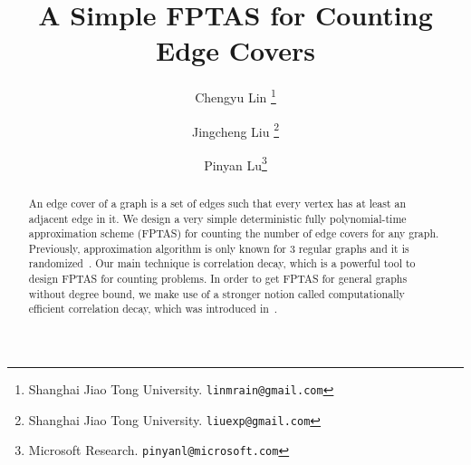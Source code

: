 \documentclass[twoside,leqno,twocolumn]{article}
\title{A Simple FPTAS for Counting Edge Covers}
\date{}
\begin{document}
\author{
	Chengyu Lin
	\thanks{Shanghai Jiao Tong University. {\tt linmrain@gmail.com}}
	\and
	Jingcheng Liu
	\thanks{Shanghai Jiao Tong University. {\tt liuexp@gmail.com}}
	\and
	Pinyan Lu\thanks{Microsoft Research. {\tt pinyanl@microsoft.com}}
}
\maketitle
\begin{abstract}
An edge cover of a graph is a set of edges such that every vertex has at least an adjacent edge in it. We design a very simple deterministic fully polynomial-time approximation scheme  (FPTAS) for counting the number of edge covers for any graph. Previously, approximation algorithm is only known for 3 regular graphs and it is randomized~\cite{MFCS09}. Our main technique is correlation decay, which is a powerful tool to design FPTAS for counting problems. In order to get FPTAS for general graphs without degree bound, we make use of a stronger notion called computationally efficient correlation decay, which was introduced in~\cite{LLY12}.
\end{abstract}


















\end{document}
